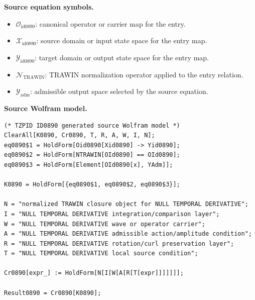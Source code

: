 \begin{minipage}[t]{0.49\linewidth}
\begingroup
\small
\raggedright
\textbf{Source equation symbols.}\par
\begin{itemize}[leftmargin=1.35em,itemsep=1pt,topsep=1pt,parsep=0pt]
    \item $\mathcal{O}_{\mathrm{id0890}}$: canonical operator or carrier map for the entry.
    \item $\mathcal{X}_{\mathrm{id0890}}$: source domain or input state space for the entry map.
    \item $\mathcal{Y}_{\mathrm{id0890}}$: target domain or output state space for the entry map.
    \item $\mathcal{N}_{\mathrm{TRAWIN}}$: TRAWIN normalization operator applied to the entry relation.
    \item $\mathcal{Y}_{\mathrm{adm}}$: admissible output space selected by the source equation.
\end{itemize}
\endgroup
\end{minipage}\hfill
\begin{minipage}[t]{0.47\linewidth}
\begingroup
\scriptsize
\raggedright
\textbf{Source Wolfram model.}\par
\begin{Verbatim}[fontsize=\tiny,breaklines=true,breakanywhere=true]
(* TZPID ID0890 generated source Wolfram model *)
ClearAll[K0890, Cr0890, T, R, A, W, I, N];
eq0890$1 = HoldForm[Oid0890[Xid0890] -> Yid0890];
eq0890$2 = HoldForm[NTRAWIN[OId0890] == OId0890];
eq0890$3 = HoldForm[Element[OId0890[x], YAdm]];

K0890 = HoldForm[{eq0890$1, eq0890$2, eq0890$3}];

N = "normalized TRAWIN closure object for NULL TEMPORAL DERIVATIVE";
I = "NULL TEMPORAL DERIVATIVE integration/comparison layer";
W = "NULL TEMPORAL DERIVATIVE wave or operator carrier";
A = "NULL TEMPORAL DERIVATIVE admissible action/amplitude condition";
R = "NULL TEMPORAL DERIVATIVE rotation/curl preservation layer";
T = "NULL TEMPORAL DERIVATIVE local source condition";

Cr0890[expr_] := HoldForm[N[I[W[A[R[T[expr]]]]]]];

Result0890 = Cr0890[K0890];
\end{Verbatim}
\endgroup
\end{minipage}

